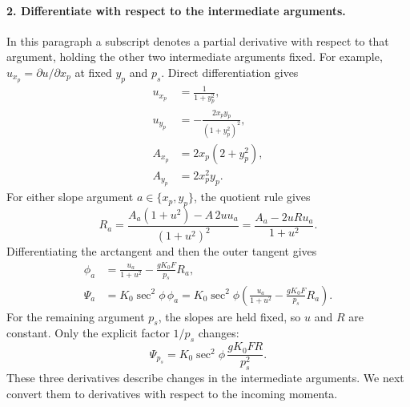 \paragraph{2. Differentiate with respect to the intermediate arguments.}
In this paragraph a subscript denotes a partial derivative with respect to
that argument, holding the other two intermediate arguments fixed.
For example, $u_{x_p}=\partial u/\partial x_p$ at fixed
$y_p$ and $p_s$. Direct differentiation gives
\begin{align}
 u_{x_p}&=\frac{1}{1+y_p^2},\\
 u_{y_p}&=-\frac{2x_py_p}{(1+y_p^2)^2},\\
 A_{x_p}&=2x_p(2+y_p^2),\\
 A_{y_p}&=2x_p^2y_p.
\end{align}
For either slope argument $a\in\{x_p,y_p\}$, the quotient rule gives
\begin{equation}
 R_a=\frac{A_a(1+u^2)-A\,2u u_a}{(1+u^2)^2}
     =\frac{A_a-2uR u_a}{1+u^2}.
\end{equation}
Differentiating the arctangent and then the outer tangent gives
\begin{align}
 \phi_a&=\frac{u_a}{1+u^2}-\frac{gK_0F}{p_s}R_a,\\
 \Psi_a&=K_0\sec^2\phi\,\phi_a
 =K_0\sec^2\phi\left(\frac{u_a}{1+u^2}
                         -\frac{gK_0F}{p_s}R_a\right).
 \label{eq:fringe_auxiliary_slope_derivative}
\end{align}
For the remaining argument $p_s$, the slopes are held fixed, so $u$ and
$R$ are constant. Only the explicit factor $1/p_s$ changes:
\begin{equation}
 \Psi_{p_s}=K_0\sec^2\phi\,\frac{gK_0F R}{p_s^2}.
 \label{eq:fringe_auxiliary_ps_derivative}
\end{equation}
These three derivatives describe changes in the intermediate arguments.
We next convert them to derivatives with respect to the incoming momenta.

